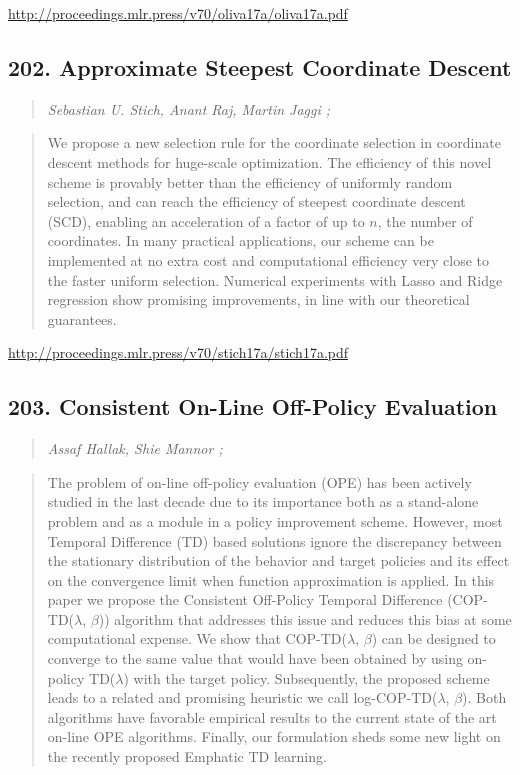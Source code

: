 \documentclass{article}
\begin{document}
\href{http://proceedings.mlr.press/v70/oliva17a/oliva17a.pdf}{http://proceedings.mlr.press/v70/oliva17a/oliva17a.pdf}

\subsection{202. Approximate Steepest Coordinate Descent}

\begin{quote}
\footnotesize{\textit{Sebastian U. Stich, Anant Raj, Martin Jaggi ;}}

\end{quote}

\begin{quote}
    We propose a new selection rule for the coordinate selection in coordinate descent methods for huge-scale optimization. The efficiency of this novel scheme is provably better than the efficiency of uniformly random selection, and can reach the efficiency of steepest coordinate descent (SCD), enabling an acceleration of a factor of up to $n$, the number of coordinates. In many practical applications, our scheme can be implemented at no extra cost and computational efficiency very close to the faster uniform selection. Numerical experiments with Lasso and Ridge regression show promising improvements, in line with our theoretical guarantees.  
\end{quote}

\href{http://proceedings.mlr.press/v70/stich17a/stich17a.pdf}{http://proceedings.mlr.press/v70/stich17a/stich17a.pdf}

\subsection{203. Consistent On-Line Off-Policy Evaluation}

\begin{quote}
\footnotesize{\textit{Assaf Hallak, Shie Mannor ;}}

\end{quote}

\begin{quote}
    The problem of on-line off-policy evaluation (OPE) has been actively studied in the last decade due to its importance both as a stand-alone problem and as a module in a policy improvement scheme. However, most Temporal Difference (TD) based solutions ignore the discrepancy between the stationary distribution of the behavior and target policies and its effect on the convergence limit when function approximation is applied. In this paper we propose the Consistent Off-Policy Temporal Difference (COP-TD($\lambda$, $\beta$)) algorithm that addresses this issue and reduces this bias at some computational expense. We show that COP-TD($\lambda$, $\beta$) can be designed to converge to the same value that would have been obtained by using on-policy TD($\lambda$) with the target policy. Subsequently, the proposed scheme leads to a related and promising heuristic we call log-COP-TD($\lambda$, $\beta$). Both algorithms have favorable empirical results to the current state of the art on-line OPE algorithms. Finally, our formulation sheds some new light on the recently proposed Emphatic TD learning.  
\end{quote}
\end{document}
